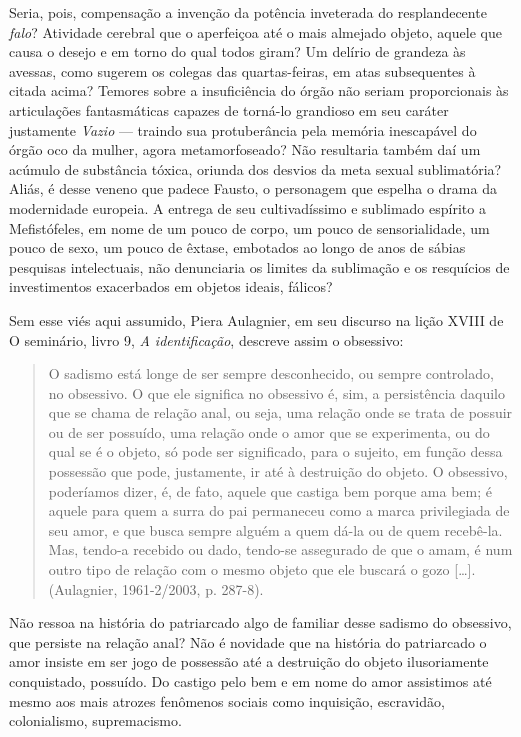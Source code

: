 Seria, pois, compensação a invenção da potência inveterada do
resplandecente \emph{falo}? Atividade cerebral que o aperfeiçoa até o
mais almejado objeto, aquele que causa o desejo e em torno do qual todos
giram? Um delírio de grandeza às avessas, como sugerem os colegas das
quartas-feiras, em atas subsequentes à citada acima? Temores sobre a
insuficiência do órgão não seriam proporcionais às articulações
fantasmáticas capazes de torná-lo grandioso em seu caráter justamente
\emph{Vazio} --- traindo sua protuberância pela memória inescapável do
órgão oco da mulher, agora metamorfoseado? Não resultaria também daí um
acúmulo de substância tóxica, oriunda dos desvios da meta sexual
sublimatória? Aliás, é desse veneno que padece Fausto, o personagem que
espelha o drama da modernidade europeia. A entrega de seu cultivadíssimo
e sublimado espírito a Mefistófeles, em nome de um pouco de corpo, um
pouco de sensorialidade, um pouco de sexo, um pouco de êxtase, embotados
ao longo de anos de sábias pesquisas intelectuais, não denunciaria os
limites da sublimação e os resquícios de investimentos exacerbados em
objetos ideais, fálicos?

Sem esse viés aqui assumido, Piera Aulagnier, em seu discurso na lição
XVIII de O seminário, livro 9, \emph{A identificação}, descreve assim o
obsessivo:

\begin{quote}
O sadismo está longe de ser sempre desconhecido, ou sempre controlado,
no obsessivo. O que ele significa no obsessivo é, sim, a persistência
daquilo que se chama de relação anal, ou seja, uma relação onde se trata
de possuir ou de ser possuído, uma relação onde o amor que se
experimenta, ou do qual se é o objeto, só pode ser significado, para o
sujeito, em função dessa possessão que pode, justamente, ir até à
destruição do objeto. O obsessivo, poderíamos dizer, é, de fato, aquele
que castiga bem porque ama bem; é aquele para quem a surra do pai
permaneceu como a marca privilegiada de seu amor, e que busca sempre
alguém a quem dá-la ou de quem recebê-la. Mas, tendo-a recebido ou dado,
tendo-se assegurado de que o amam, é num outro tipo de relação com o
mesmo objeto que ele buscará o gozo {[}\ldots{}{]}. (Aulagnier, 1961-2/2003,
p. 287-8).
\end{quote}

Não ressoa na história do patriarcado algo de familiar desse sadismo do
obsessivo, que persiste na relação anal? Não é novidade que na história
do patriarcado o amor insiste em ser jogo de possessão até a destruição
do objeto ilusoriamente conquistado, possuído. Do castigo pelo bem e em
nome do amor assistimos até mesmo aos mais atrozes fenômenos sociais
como inquisição, escravidão, colonialismo, supremacismo.

